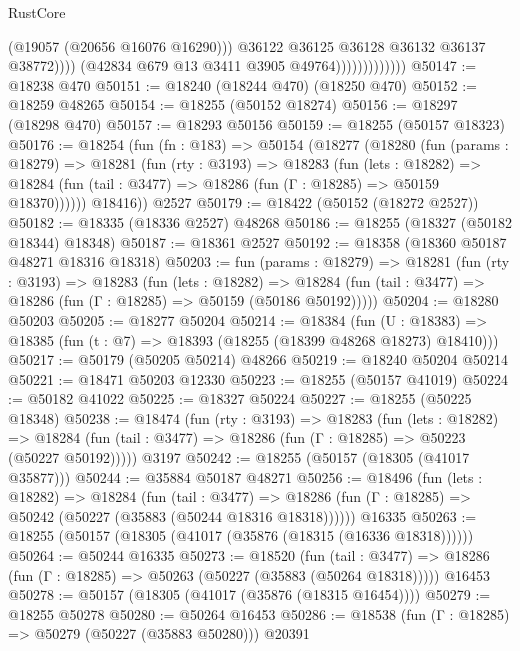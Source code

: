 \begin{lexlean}{RustCore}
\begin{coremodule}
                                      (@19057 (@20656 @16076 @16290)))
                                    @36122
                                    @36125
                                    @36128
                                    @36132
                                    @36137
                                    @38772))))
                            (@42834 @679 @13 @3411 @3905 @49764)))))))))))))
@50147 := @18238 @470
@50151 := @18240 (@18244 @470) (@18250 @470)
@50152 := @18259 @48265
@50154 := @18255 (@50152 @18274)
@50156 := @18297 (@18298 @470)
@50157 := @18293 @50156
@50159 := @18255 (@50157 @18323)
@50176 := @18254
    (fun (fn : @183) =>
    @50154
      (@18277
        (@18280
          (fun (params : @18279) =>
          @18281
            (fun (rty : @3193) =>
            @18283
              (fun (lets : @18282) =>
              @18284 (fun (tail : @3477) => @18286 (fun (Γ : @18285) => @50159 @18370))))))
        @18416))
    @2527
@50179 := @18422 (@50152 (@18272 @2527))
@50182 := @18335 (@18336 @2527) @48268
@50186 := @18255 (@18327 (@50182 @18344) @18348)
@50187 := @18361 @2527
@50192 := @18358 (@18360 @50187 @48271 @18316 @18318)
@50203 := fun (params : @18279) =>
  @18281
    (fun (rty : @3193) =>
    @18283
      (fun (lets : @18282) =>
      @18284 (fun (tail : @3477) => @18286 (fun (Γ : @18285) => @50159 (@50186 @50192)))))
@50204 := @18280 @50203
@50205 := @18277 @50204
@50214 := @18384
    (fun (U : @18383) => @18385 (fun (t : @7) => @18393 (@18255 (@18399 @48268 @18273) @18410)))
@50217 := @50179 (@50205 @50214) @48266
@50219 := @18240 @50204 @50214
@50221 := @18471 @50203 @12330
@50223 := @18255 (@50157 @41019)
@50224 := @50182 @41022
@50225 := @18327 @50224
@50227 := @18255 (@50225 @18348)
@50238 := @18474
    (fun (rty : @3193) =>
    @18283
      (fun (lets : @18282) =>
      @18284 (fun (tail : @3477) => @18286 (fun (Γ : @18285) => @50223 (@50227 @50192)))))
    @3197
@50242 := @18255 (@50157 (@18305 (@41017 @35877)))
@50244 := @35884 @50187 @48271
@50256 := @18496
    (fun (lets : @18282) =>
    @18284
      (fun (tail : @3477) =>
      @18286 (fun (Γ : @18285) => @50242 (@50227 (@35883 (@50244 @18316 @18318))))))
    @16335
@50263 := @18255 (@50157 (@18305 (@41017 (@35876 (@18315 (@16336 @18318))))))
@50264 := @50244 @16335
@50273 := @18520
    (fun (tail : @3477) => @18286 (fun (Γ : @18285) => @50263 (@50227 (@35883 (@50264 @18318)))))
    @16453
@50278 := @50157 (@18305 (@41017 (@35876 (@18315 @16454))))
@50279 := @18255 @50278
@50280 := @50264 @16453
@50286 := @18538 (fun (Γ : @18285) => @50279 (@50227 (@35883 @50280))) @20391

\end{coremodule}
\end{lexlean}
